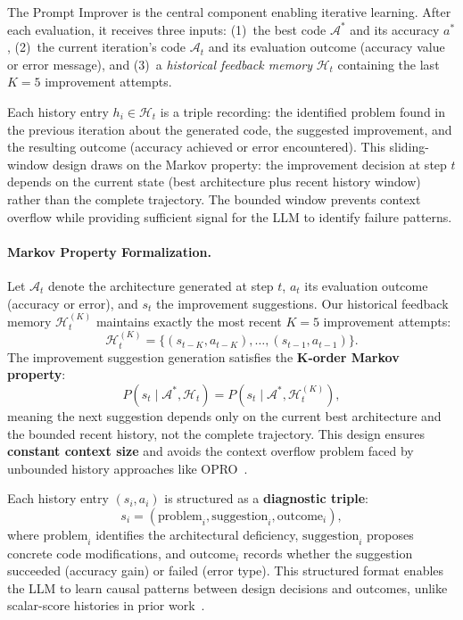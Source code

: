 \documentclass[10pt,twocolumn,letterpaper]{article}
\begin{document}
	The Prompt Improver is the central component enabling iterative learning. After each evaluation, it receives three inputs: (1)~the best code $\mathcal{A}^*$ and its accuracy $a^*$, (2)~the current iteration's code $\mathcal{A}_t$ and its evaluation outcome (accuracy value or error message), and (3)~a \emph{historical feedback memory} $\mathcal{H}_t$ containing the last $K{=}5$ improvement attempts.
	
	Each history entry $h_i \in \mathcal{H}_t$ is a triple recording: the identified problem found in the previous iteration about the generated code, the suggested improvement, and the resulting outcome (accuracy achieved or error encountered). This sliding-window design draws on the Markov property: the improvement decision at step $t$ depends on the current state (best architecture plus recent history window) rather than the complete trajectory. The bounded window prevents context overflow while providing sufficient signal for the LLM to identify failure patterns.
	
	\paragraph{Markov Property Formalization.}
	Let $\mathcal{A}_t$ denote the architecture generated at step $t$, $a_t$ its 
	evaluation outcome (accuracy or error), and $s_t$ the improvement suggestions. 
	Our historical feedback memory $\mathcal{H}_t^{(K)}$ maintains exactly the most 
	recent $K{=}5$ improvement attempts:
	\begin{equation}
	\mathcal{H}_t^{(K)} = \{(s_{t-K}, a_{t-K}), \ldots, (s_{t-1}, a_{t-1})\}.
	\end{equation}
	The improvement suggestion generation satisfies the \textbf{K-order Markov property}:
	\begin{equation}
	P(s_t \mid \mathcal{A}^*, \mathcal{H}_t) = P(s_t \mid \mathcal{A}^*, \mathcal{H}_t^{(K)}),
	\end{equation}
	meaning the next suggestion depends only on the current best architecture and 
	the bounded recent history, not the complete trajectory. This design ensures 
	\textbf{constant context size} and avoids the context overflow problem faced 
	by unbounded history approaches like OPRO~\cite{Yang2023OPRO}.
	
	Each history entry $(s_i, a_i)$ is structured as a \textbf{diagnostic triple}:
	\begin{equation}
	s_i = (\text{problem}_i, \text{suggestion}_i, \text{outcome}_i),
	\end{equation}
	where $\text{problem}_i$ identifies the architectural deficiency, 
	$\text{suggestion}_i$ proposes concrete code modifications, and $\text{outcome}_i$ 
	records whether the suggestion succeeded (accuracy gain) or failed (error type). 
	This structured format enables the LLM to learn causal patterns between design 
	decisions and outcomes, unlike scalar-score histories in prior work~\cite{Yang2023OPRO,Romera2023FunSearch}.
	
\end{document}
